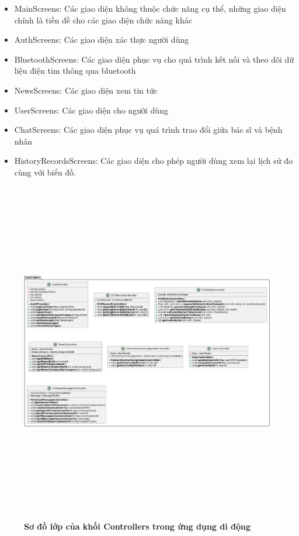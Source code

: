 \begin{enumerate}[a)]
  \begin{itemize}
    \item MainScreens: Các giao diện không thuộc chức năng cụ thể, những giao diện chính là tiền đề cho các giao diện chức năng khác
    \item AuthScreens: Các giao diện xác thực người dùng 
    \item BluetoothScreens: Các giao diện phục vụ cho quá trình kết nối và theo dõi dữ liệu điện tim thông qua bluetooth
    \item NewsScreens: Các giao diện xem tin tức
    \item UserScreens: Các giao diện cho người dùng
    \item ChatScreens: Các giao diện phục vụ quá trình trao đổi giữa bác sĩ và bệnh nhân
    \item HistoryRecordsScreens: Các giao diện cho phép người dùng xem lại lịch sử đo cùng với biểu đồ. 
  \end{itemize}
  
  \begin{figure}[H]
    \centering
    \includegraphics[width=16cm,height=15cm]{Images/mobile_app/class_diagram/mobile_class_controller.png}
    \caption[Sơ đồ lớp của khối Controllers trong ứng dụng di động]{\bfseries \fontsize{12pt}{0pt}\selectfont Sơ đồ lớp của khối Controllers trong ứng dụng di động}
    \label{mobile_class_controller} %
  \end{figure}


\end{enumerate}
